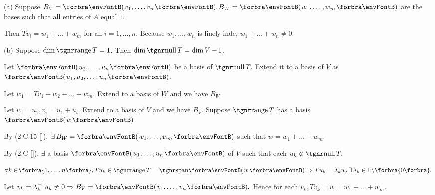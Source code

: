 \documentclass[a4paper, 11pt, UTF8]{article}
\begin{document}
\begin{large}
\par\quad
(a) Suppose $B_V=\Par{v_1,\dots,v_n},B_W=\Par{w_1,\dots,w_m}$ are the bases such that all entries of $A$ equal $1$.\vspace{6pt}\par\quad\Ha
Then $Tv_i=w_1+\dots+w_m$ for all $i=1,\dots,n$. Because $w_1,\dots,w_n$ is linely inde, $w_1+\dots+w_n\neq 0.$\par\quad
(b) Suppose $\dim\range T=1$. Then $\dim\null T=\dim V-1$.\par\quad\Hb
Let $\Par{u_2,\dots,u_n}$ be a basis of $\null T.$ Extend it to a basis of $V$ as $\Par{u_1,u_2,\dots,u_n}$.\par\quad\Hb
Let $w_1=Tv_1-w_2-\dots-w_m.$ Extend to a basis of $W$ and we have $B_W$.\par\quad\Hb
Let $v_1=u_1,v_i=u_1+u_i.$ Extend to a basis of $V$ and we have $B_V.$\PfEnd\vspace{10pt}\quad\Hb
\Or Suppose $\range T$ has a basis $\Par{w}$.\par\quad\Hb
By (2.C.15 [\COROLLARY]), $\exists\,B_W=\Par{w_1,\dots,w_m}$ such that $w=w_1+\dots+w_m.$\par\quad\Hb
By (2.C [\NEWTHEOREM]), $\exists$ a basis $\Par{u_1,\dots,u_n}$ of $V$ such that each $u_k\not\in\null T.$\par\quad\Hb
$\forall k\in\!\Bra{1,\dots,n},Tu_k\in\range T=\Span{w}\Rightarrow Tu_k=\lambda_k w,\exists\,\lambda_k\in\Fbb\backslash\zeroSubs.$\par\quad\Hb
Let $v_k=\lambda_k^{-1}u_k\neq 0\Rightarrow B_V=\Par{v_1,\dots,v_n}.$ Hence for each $v_k,Tv_k=w=w_1+\dots+w_m.$\PfEnd
\SepLine

\pagebreak


\end{large}
\end{document}
